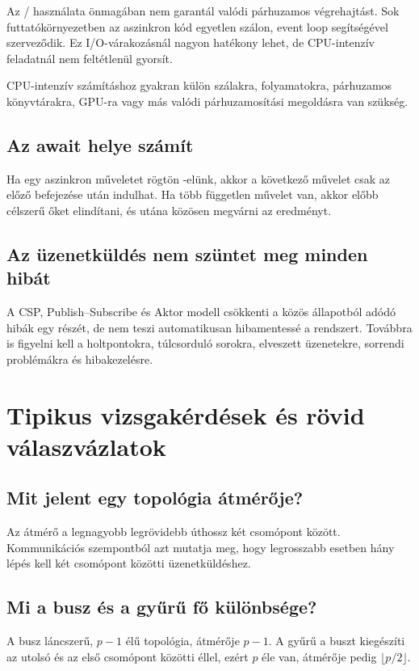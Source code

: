 Az / használata önmagában nem garantál valódi párhuzamos végrehajtást. Sok futtatókörnyezetben az aszinkron kód egyetlen szálon, event loop segítségével szerveződik. Ez I/O-várakozásnál nagyon hatékony lehet, de CPU-intenzív feladatnál nem feltétlenül gyorsít.

CPU-intenzív számításhoz gyakran külön szálakra, folyamatokra, párhuzamos könyvtárakra, GPU-ra vagy más valódi párhuzamosítási megoldásra van szükség.

\subsection{Az await helye számít}

Ha egy aszinkron műveletet rögtön -elünk, akkor a következő művelet csak az előző befejezése után indulhat. Ha több független művelet van, akkor előbb célszerű őket elindítani, és utána közösen megvárni az eredményt.

\subsection{Az üzenetküldés nem szüntet meg minden hibát}

A CSP, Publish--Subscribe és Aktor modell csökkenti a közös állapotból adódó hibák egy részét, de nem teszi automatikusan hibamentessé a rendszert. Továbbra is figyelni kell a holtpontokra, túlcsorduló sorokra, elveszett üzenetekre, sorrendi problémákra és hibakezelésre.

\section{Tipikus vizsgakérdések és rövid válaszvázlatok}

\subsection{Mit jelent egy topológia átmérője?}

Az átmérő a legnagyobb legrövidebb úthossz két csomópont között. Kommunikációs szempontból azt mutatja meg, hogy legrosszabb esetben hány lépés kell két csomópont közötti üzenetküldéshez.

\subsection{Mi a busz és a gyűrű fő különbsége?}

A busz láncszerű, $p-1$ élű topológia, átmérője $p-1$. A gyűrű a buszt kiegészíti az utolsó és az első csomópont közötti éllel, ezért $p$ éle van, átmérője pedig $\lfloor p/2\rfloor$.

